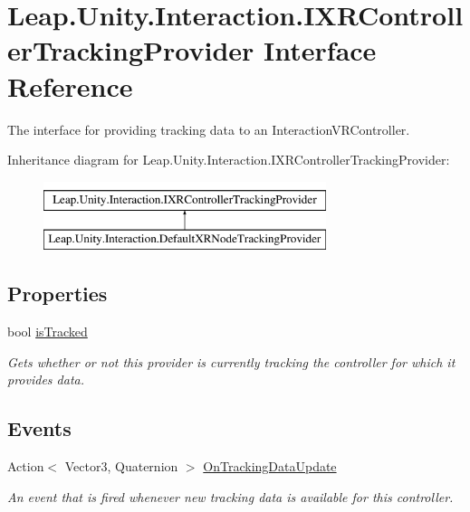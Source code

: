 \hypertarget{interface_leap_1_1_unity_1_1_interaction_1_1_i_x_r_controller_tracking_provider}{}\section{Leap.\+Unity.\+Interaction.\+I\+X\+R\+Controller\+Tracking\+Provider Interface Reference}
\label{interface_leap_1_1_unity_1_1_interaction_1_1_i_x_r_controller_tracking_provider}


The interface for providing tracking data to an Interaction\+V\+R\+Controller.  


Inheritance diagram for Leap.\+Unity.\+Interaction.\+I\+X\+R\+Controller\+Tracking\+Provider\+:\begin{figure}[H]
\begin{center}
\leavevmode
\includegraphics[height=2.000000cm]{interface_leap_1_1_unity_1_1_interaction_1_1_i_x_r_controller_tracking_provider}
\end{center}
\end{figure}
\subsection*{Properties}
\begin{DoxyCompactItemize}
\item 
bool \mbox{\hyperlink{interface_leap_1_1_unity_1_1_interaction_1_1_i_x_r_controller_tracking_provider_a7f6ac99e8fafd091151ed615626ddf1b}{is\+Tracked}}
\begin{DoxyCompactList}\small\item\em Gets whether or not this provider is currently tracking the controller for which it provides data. \end{DoxyCompactList}\end{DoxyCompactItemize}
\subsection*{Events}
\begin{DoxyCompactItemize}
\item 
Action$<$ Vector3, Quaternion $>$ \mbox{\hyperlink{interface_leap_1_1_unity_1_1_interaction_1_1_i_x_r_controller_tracking_provider_a621b53b241147b7a9af4c3c58c15fba4}{On\+Tracking\+Data\+Update}}
\begin{DoxyCompactList}\small\item\em An event that is fired whenever new tracking data is available for this controller. \end{DoxyCompactList}\end{DoxyCompactItemize}


